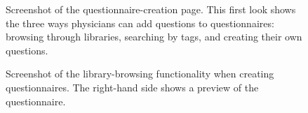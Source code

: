 \documentclass{higrep}
\begin{document}
\begin{figure}[htbp]
  \centering
  \caption{Screenshot of the questionnaire-creation page. This first look shows the three ways physicians can add questions to questionnaires: browsing through libraries, searching by tags, and creating their own questions.} \label{Fig:create}
\end{figure}

\begin{figure}[htbp]
  \centering
  \caption{Screenshot of the library-browsing functionality when creating questionnaires. The right-hand side shows a preview of the questionnaire.} \label{Fig:create_libraries}
\end{figure}
\end{document}
